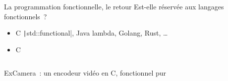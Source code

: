\documentclass[10pt]{beamer}
\newcommand\CXX{C\nolinebreak[4]\hspace{-.05em}\raisebox{.4ex}{\relsize{-3}{\textbf{++}}}}
\begin{document}
\begin{frame}{La programmation fonctionnelle, le retour}
  Est-elle réservée aux langages fonctionnels~?
  \begin{itemize}
  \item \CXX{} \texttt|std::functional|, Java lambda, Golang, Rust, …
  \item C \inputminted{c}{./attributes.c}
  \end{itemize}

  ExCamera~\cite{fouladi2017encoding}: un encodeur vidéo en \CXX{},
  fonctionnel pur
\end{frame}

\begin{frame}[allowframebreaks]
  \nocite{*}
  \printbibliography{}
\end{frame}
\end{document}
